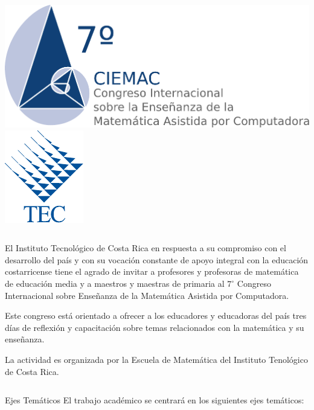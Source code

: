 \documentclass[x11names,table,usenames,dvipsnames]{beamer}
\title[CIEMAC]{}%
\author{}%
\institute[ITCR]{\Large Instituto Tecnol\'ogico de Costa Rica}
\date{Diciembre, 2011}
\begin{document}
  \begin{frame}[plain]{} 

    \hspace*{5cm}
      \includegraphics[scale=1.5]{LogoCIEMAC}
      \hspace*{9cm}
      \vspace*{-3cm}
      \includegraphics[scale=2.5]{LogoTECMemorias}
      
    \vspace*{2cm}
    \maketitle
    \vspace*{-2cm}
    \begin{columns}[t]
    \begin{column}{.8\linewidth}
    \begin{block}{}
      El Instituto Tecnológico de Costa Rica en respuesta a su compromiso con el desarrollo del país y con su vocación constante de apoyo integral con la educación costarricense tiene el agrado de invitar a profesores y profesoras de matemática de educación media y a maestros y maestras de primaria al $7^\circ$ Congreso Internacional sobre Enseñanza de la Matemática Asistida por Computadora.

Este congreso está orientado a ofrecer a los educadores y educadoras del país tres días de reflexión y capacitación sobre temas relacionados con la matemática y su enseñanza.

La actividad es organizada por la Escuela de Matemática del Instituto Tenológico de Costa Rica.
    \end{block}
    \end{column}
    \end{columns}
    \vfill
    \begin{columns}[t]
      \begin{column}{.48\linewidth}
        \begin{block}{Ejes Temáticos}
El trabajo académico se centrará en los siguientes ejes temáticos:


\end{block}
\end{column}
\end{columns}
\end{frame}
\end{document}

